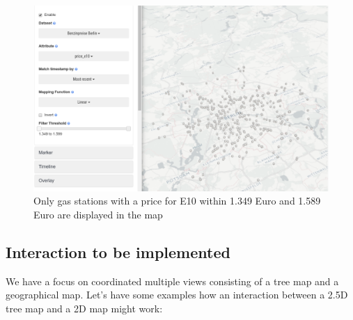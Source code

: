 \documentclass{article}
\newcommand{\map}{\textsc{2D} map}
\newcommand{\tmap}{\textsc{2.5D} tree map}
\begin{document}
\begin{figure}[h!]
  \centering
  \includegraphics[width=\textwidth]{images/existing-interactions-filter.png}
  \caption{ Only gas stations with a price for E10 within 1.349 Euro and 1.589 Euro are displayed in the map}
  \label{fig:analysis:interaction:existing:filter}
\end{figure}



\subsection{Interaction to be implemented}


We have a focus on coordinated multiple views consisting of a tree map and a geographical map.
Let's have some examples how an interaction between a \tmap{} and a \map{} might work:
\end{document}
